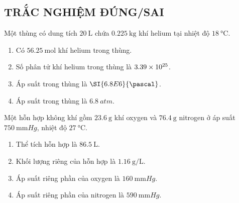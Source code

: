 \subsection{TRẮC NGHIỆM ĐÚNG/SAI}
\setcounter{ex}{0}
\begin{ex}
	Một thùng có dung tích $\SI{20}{\liter}$ chứa $\SI{0.225}{\kilogram}$ khí helium tại nhiệt độ $\SI{18}{\celsius}$.
	\begin{enumerate}[label=\alph*)]
		\item Có $\SI{56.25}{\mole}$ khí helium trong thùng.
		\item Số phân tử khí helium trong thùng là $\SI{3.39E25}{}$.
		\item Áp suất trong thùng là $\SI{6.8E6}{\pascal}$.
		\item Áp suất trong thùng là $\SI{6.8}{atm}$.
	\end{enumerate}
\end{ex}
\begin{ex}
Một hỗn hợp không khí gồm $\SI{23.6}{\gram}$ khí oxygen và $\SI{76.4}{\gram}$ nitrogen ở áp suất $\SI{750}{\milli\meter Hg}$, nhiệt độ $\SI{27}{\celsius}$.
\begin{enumerate}[label=\alph*)]
	\item Thể tích hỗn hợp là $\SI{86.5}{\liter}$.
	\item  Khối lượng riêng của hỗn hợp là $\SI{1.16}{\gram/\liter}$.
	\item Áp suất riêng phần của oxygen là $\SI{160}{\milli\meter Hg}$.
	\item Áp suất riêng phần của nitrogen là $\SI{590}{\milli\meter Hg}$.
\end{enumerate}
	
\end{ex}
